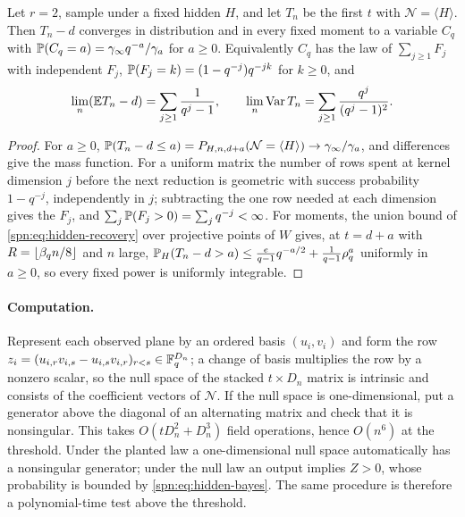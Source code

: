 \begin{corollary}\label{spn:cor:hidden-overhead}
Let $r=2$, sample under a fixed hidden $H$, and let $T_n$ be the first $t$ with $\mathcal N=\langle
H\rangle$. Then $T_n-d$ converges in distribution and in every fixed moment to a variable $C_q$ with
$\mathbb{P}(C_q=a)=\gamma_\infty q^{-a}/\gamma_a$ for $a\ge0$. Equivalently $C_q$ has the law of
$\sum_{j\ge1}F_j$ with independent $F_j$, $\mathbb{P}(F_j=k)=(1-q^{-j})q^{-jk}$ for $k\ge0$, and
\[
 \lim_n(\mathbb{E} T_n-d)=\sum_{j\ge1}\frac1{q^j-1},\qquad \lim_n\operatorname{Var}T_n=\sum_{j\ge1}\frac{q^j}{(q^j-1)^2}.
\]
\end{corollary}

\begin{proof}
For $a\ge0$, $\mathbb{P}(T_n-d\le a)=P_{H,n,d+a}(\mathcal N=\langle H\rangle)\to\gamma_\infty/\gamma_a$, and
differences give the mass function. For a uniform matrix the number of rows spent at kernel
dimension $j$ before the next reduction is geometric with success probability $1-q^{-j}$,
independently in $j$; subtracting the one row needed at each dimension gives the $F_j$, and
$\sum_j\mathbb{P}(F_j>0)=\sum_jq^{-j}<\infty$. For moments, the union bound of \eqref{spn:eq:hidden-recovery}
over projective points of $W$ gives, at $t=d+a$ with $R=\lfloor\beta_qn/8\rfloor$ and $n$ large,
$\mathbb{P}_H(T_n-d>a)\le\frac e{q-1}q^{-a/2}+\frac1{q-1}\rho_q^a$ uniformly in $a\ge0$, so every fixed
power is uniformly integrable.
\end{proof}

\paragraph{Computation.}

\begin{remark}\label{spn:rem:hidden-recovery}
Represent each observed plane by an ordered basis $(u_i,v_i)$ and form the row
$z_i=(u_{i,r}v_{i,s}-u_{i,s}v_{i,r})_{r<s}\in\mathbb{F}_q^{D_n}$; a change of basis multiplies the row by a
nonzero scalar, so the null space of the stacked $t\times D_n$ matrix is intrinsic and consists of
the coefficient vectors of $\mathcal N$. If the null space is one-dimensional, put a generator above
the diagonal of an alternating matrix and check that it is nonsingular. This takes
$O(tD_n^2+D_n^3)$ field operations, hence $O(n^6)$ at the threshold. Under the planted law a
one-dimensional null space automatically has a nonsingular generator; under the null law an output
implies $Z>0$, whose probability is bounded by \eqref{spn:eq:hidden-bayes}. The same procedure is
therefore a polynomial-time test above the threshold.
\end{remark}

